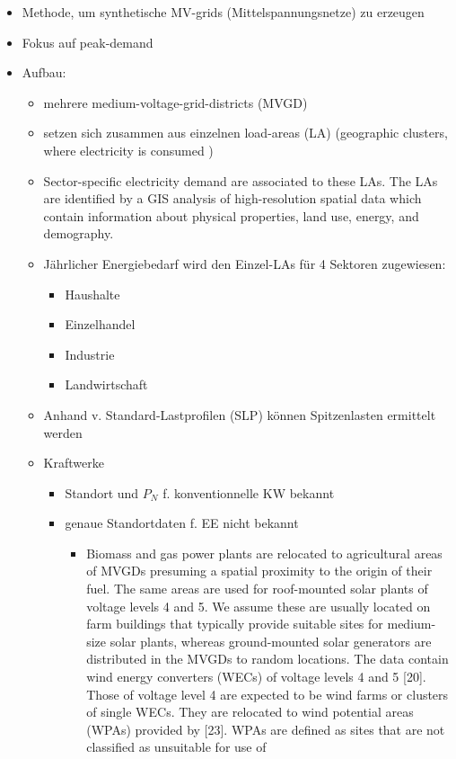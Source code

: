 \documentclass[
a4paper,     %
12pt         %
]{scrartcl}  %
\begin{document}
\begin{itemize}
	\item Methode, um synthetische MV-grids (Mittelspannungsnetze) zu erzeugen
	\item Fokus auf peak-demand
	\item Aufbau:
	\begin{itemize}
		\item mehrere medium-voltage-grid-districts (MVGD)
		\item setzen sich zusammen aus einzelnen load-areas (LA) (\glqq geographic clusters, where electricity is consumed \grqq)
		\item[] Sector-specific electricity demand are associated to these
		LAs. The LAs are identified by a GIS analysis of high-resolution spatial data which contain
		information about physical properties, land use, energy, and demography.
		\item Jährlicher Energiebedarf wird den Einzel-LAs für 4 Sektoren zugewiesen:
		\begin{itemize}
			\item Haushalte
			\item Einzelhandel
			\item Industrie
			\item Landwirtschaft
		\end{itemize}
		\item Anhand v. Standard-Lastprofilen (SLP) können Spitzenlasten ermittelt werden
		\item Kraftwerke
		\begin{itemize}
			\item Standort und $P_N$ f. konventionnelle KW bekannt
			\item genaue Standortdaten f. EE nicht bekannt
			\begin{itemize}
				\item Biomass and gas power plants are relocated to agricultural areas of MVGDs presuming a
				spatial proximity to the origin of their fuel. The same areas are used for roof-mounted solar
				plants of voltage levels 4 and 5. We assume these are usually located on farm buildings that
				typically provide suitable sites for medium-size solar plants, whereas ground-mounted solar
				generators are distributed in the MVGDs to random locations. The data contain wind energy
				converters (WECs) of voltage levels 4 and 5 [20]. Those of voltage level 4 are expected to be
				wind farms or clusters of single WECs. They are relocated to wind potential areas (WPAs)
				provided by [23]. WPAs are defined as sites that are not classified as unsuitable for use of

\end{itemize}
\end{itemize}
\end{itemize}
\end{itemize}
\end{document}
